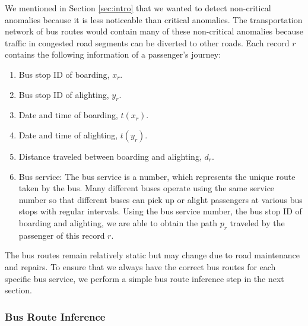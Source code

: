 \documentclass[conference]{IEEEtran.1.8}
\begin{document}
We mentioned in Section \ref{sec:intro} that we wanted to detect non-critical anomalies because it is less noticeable than critical anomalies. The transportation network of bus routes would contain many of these non-critical anomalies because traffic in congested road segments can be diverted to other roads. 
Each record $r$ contains the following information of a passenger's journey:
\begin{enumerate}
	\item Bus stop ID of boarding, $x_r$.
	\item Bus stop ID of alighting, $y_r$.
	\item Date and time of boarding, $t(x_r)$.
	\item Date and time of alighting, $t(y_r)$.
	\item Distance traveled between boarding and alighting, $d_r$.
	\item Bus service: The bus service is a number, which represents the unique route taken by the bus. Many different buses operate using the same service number so that different buses can pick up or alight passengers at various bus stops with regular intervals. Using the bus service number, the bus stop ID of boarding and alighting, we are able to obtain the path $p_r$ traveled by the passenger of this record $r$.
\end{enumerate}
The bus routes remain relatively static but may change due to road maintenance and repairs. To ensure that we always have the correct bus routes for each specific bus service, we perform a simple bus route inference step in the next section.

\subsubsection{Bus Route Inference}
\end{document}
